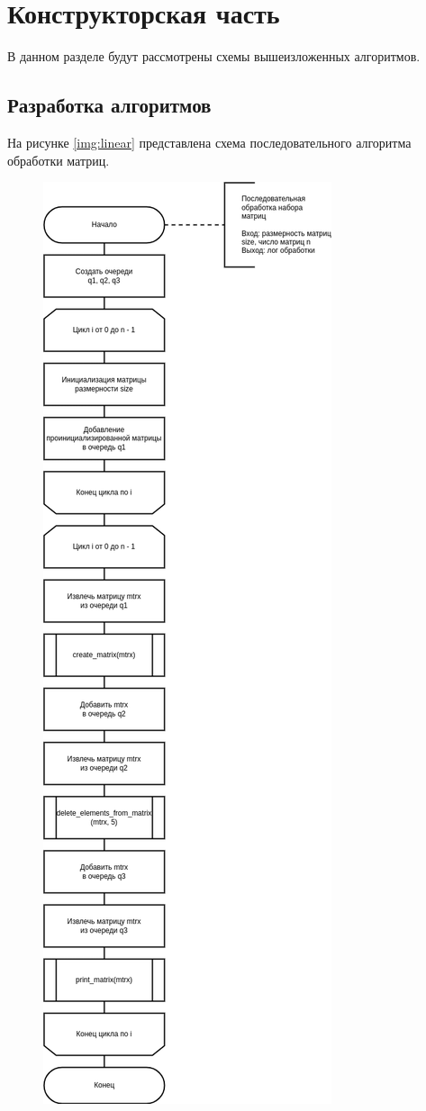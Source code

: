 \chapter{Конструкторская часть}

В данном разделе будут рассмотрены схемы вышеизложенных алгоритмов.

\section{Разработка алгоритмов}

На рисунке \ref{img:linear} представлена схема последовательного алгоритма обработки матриц.

\begin{figure}[H]
	\begin{center}
		\includegraphics[scale=0.45]{img/linear.png}

\end{center}
\end{figure}
